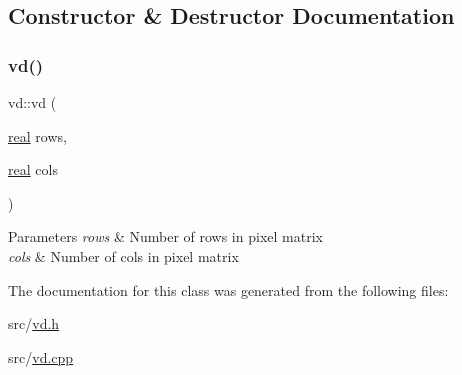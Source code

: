\subsection{Constructor \& Destructor Documentation}
\mbox{\label{classvd_a765c16ee377a2a0f9651d555edd3a158}} 
\subsubsection{\texorpdfstring{vd()}{vd()}}
{\footnotesize\ttfamily vd\+::vd (\begin{DoxyParamCaption}\item[{\mbox{\hyperlink{typedefs_8h_a58a0c7cf2501f4492da833421be92547}{real}}}]{rows,  }\item[{\mbox{\hyperlink{typedefs_8h_a58a0c7cf2501f4492da833421be92547}{real}}}]{cols }\end{DoxyParamCaption})}


\begin{DoxyParams}{Parameters}
{\em rows} & Number of rows in pixel matrix \\
\hline
{\em cols} & Number of cols in pixel matrix \\
\hline
\end{DoxyParams}


The documentation for this class was generated from the following files\+:\begin{DoxyCompactItemize}
\item 
src/\mbox{\hyperlink{vd_8h}{vd.\+h}}\item 
src/\mbox{\hyperlink{vd_8cpp}{vd.\+cpp}}\end{DoxyCompactItemize}
